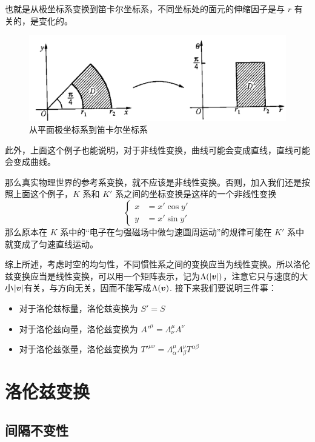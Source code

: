 \documentclass[12pt, a4paper, oneside]{ctexbook}
\begin{document}
也就是从极坐标系变换到笛卡尔坐标系，不同坐标处的面元的伸缩因子是与 $r$ 有关的，是变化的。\par 
\begin{figure}[H]
	\centering
	\includegraphics[scale=0.4]{figures/non-linear transform.png}
	\caption{从平面极坐标系到笛卡尔坐标系}
\end{figure}
此外，上面这个例子也能说明，对于非线性变换，曲线可能会变成直线，直线可能会变成曲线。\par   

那么真实物理世界的参考系变换，就不应该是非线性变换。否则，加入我们还是按照上面这个例子，$K$ 系和 $K'$ 系之间的坐标变换是这样的一个非线性变换
\begin{equation}
	\left\{\begin{aligned}
		x&=x'\cos y' \\
		y&=x'\sin y'
	\end{aligned}\right.
\end{equation}
那么原本在 $K$ 系中的“电子在匀强磁场中做匀速圆周运动”的规律可能在 $K'$ 系中就变成了匀速直线运动。

综上所述，考虑时空的均匀性，不同惯性系之间的变换应当为线性变换。所以洛伦兹变换应当是线性变换，可以用一个矩阵表示，记为$\Lambda(|\vb*{v}|)$，注意它只与速度的大小$|\vb*{v}|$有关，与方向无关，因而不能写成$\Lambda(\vb*{v})$. 接下来我们要说明三件事：
\begin{itemize}
	\item 对于洛伦兹标量，洛伦兹变换为 $S'=S$
	\item 对于洛伦兹向量，洛伦兹变换为 $A'^{\mu}=\Lambda^{\mu}_{\nu}A^{\nu}$
	\item 对于洛伦兹张量，洛伦兹变换为 $T'^{\mu\nu}=\Lambda^{\mu}_{\alpha}\Lambda^{\nu}_{\beta}T^{\alpha\beta}$
\end{itemize}

\section{洛伦兹变换}

\subsection{间隔不变性}
\end{document}
